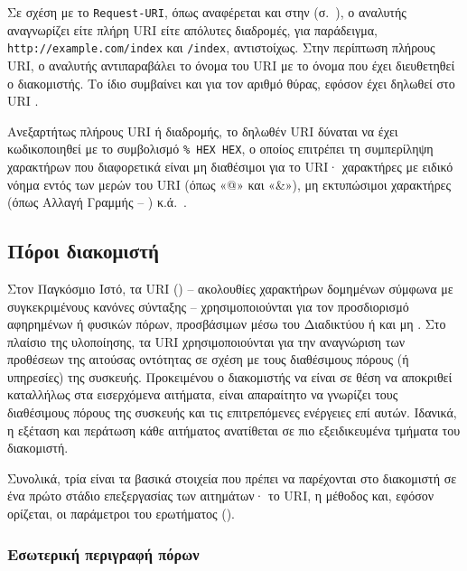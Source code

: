 Σε σχέση με το \verb~Request-URI~, όπως αναφέρεται και στην
(σ.~\pageref{ssubsec:network:resource-general}), ο αναλυτής αναγνωρίζει είτε
πλήρη URI είτε απόλυτες διαδρομές, για παράδειγμα,
\verb~http://example.com/index~ και \verb~/index~, αντιστοίχως. Στην περίπτωση
πλήρους URI, ο αναλυτής αντιπαραβάλει το όνομα του URI με το όνομα που έχει
διευθετηθεί ο διακομιστής. Το ίδιο συμβαίνει και για τον αριθμό θύρας, εφόσον
έχει δηλωθεί στο URI \parencite[49]{rfc3986}.

Ανεξαρτήτως πλήρους URI ή διαδρομής, το δηλωθέν URI δύναται να έχει
κωδικοποιηθεί με το συμβολισμό \verb~% HEX HEX~, ο οποίος επιτρέπει τη
συμπερίληψη χαρακτήρων που διαφορετικά είναι μη διαθέσιμοι για το URI·
χαρακτήρες με ειδικό νόημα εντός των μερών του URI (όπως «@» και «\&»), μη
εκτυπώσιμοι χαρακτήρες (όπως Αλλαγή Γραμμής -- ) κ.ά.\
\parencite[9--11]{rfc2396}.


\subsection{Πόροι διακομιστή}
\label{subsec:network:resource}

Στον Παγκόσμιο Ιστό, τα URI () -- ακολουθίες
χαρακτήρων δομημένων σύμφωνα με συγκεκριμένους κανόνες σύνταξης --
χρησιμοποιούνται για τον προσδιορισμό αφηρημένων ή φυσικών πόρων, προσβάσιμων
μέσω του Διαδικτύου ή και μη \parencite[1,5]{rfc3986}.
Στο πλαίσιο της υλοποίησης, τα URI χρησιμοποιούνται για την αναγνώριση των
προθέσεων της αιτούσας οντότητας σε σχέση με τους διαθέσιμους πόρους (ή
υπηρεσίες) της συσκευής. Προκειμένου ο διακομιστής να είναι σε θέση να αποκριθεί
καταλλήλως στα εισερχόμενα αιτήματα, είναι απαραίτητο να γνωρίζει τους
διαθέσιμους πόρους της συσκευής και τις επιτρεπόμενες ενέργειες επί αυτών.
Ιδανικά, η εξέταση και περάτωση κάθε αιτήματος ανατίθεται σε πιο εξειδικευμένα
τμήματα του διακομιστή.

Συνολικά, τρία είναι τα βασικά στοιχεία που πρέπει να παρέχονται στο διακομιστή
σε ένα πρώτο στάδιο επεξεργασίας των αιτημάτων· το URI, η μέθοδος και, εφόσον
ορίζεται, οι παράμετροι του ερωτήματος (\te{query string}).

\subsubsection{Εσωτερική περιγραφή πόρων}
\label{ssubsec:network:resource-general}

